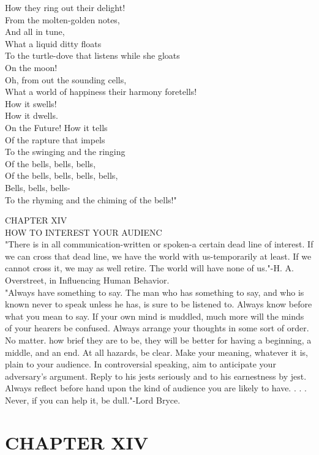 \documentclass[10pt]{article}
\begin{document}
\begin{enumerate}
How they ring out their delight!\\
From the molten-golden notes,\\
And all in tune,\\
What a liquid ditty floats\\
To the turtle-dove that listens while she gloats\\
On the moon!\\
Oh, from out the sounding cells,\\
What a world of happiness their harmony foretells!\\
How it swells!\\
How it dwells.\\
On the Future! How it tells\\
Of the rapture that impels\\
To the swinging and the ringing\\
Of the bells, bells, bells,\\
Of the bells, bells, bells, bells,\\
Bells, bells, bells-\\
To the rhyming and the chiming of the bells!"
\end{enumerate}

CHAPTER XIV\\
HOW TO INTEREST YOUR AUDIENC\\
"There is in all communication-written or spoken-a certain dead line of interest. If we can cross that dead line, we have the world with us-temporarily at least. If we cannot cross it, we may as well retire. The world will have none of us."-H. A. Overstreet, in Influencing Human Behavior.\\
"Always have something to say. The man who has something to say, and who is known never to speak unless he has, is sure to be listened to. Always know before what you mean to say. If your own mind is muddled, much more will the minds of your hearers be confused. Always arrange your thoughts in some sort of order. No matter. how brief they are to be, they will be better for having a beginning, a middle, and an end. At all hazards, be clear. Make your meaning, whatever it is, plain to your audience. In controversial speaking, aim to anticipate your adversary's argument. Reply to his jests seriously and to his earnestness by jest. Always reflect before hand upon the kind of audience you are likely to have. . . . Never, if you can help it, be dull."-Lord Bryce.

\section*{CHAPTER XIV}
\end{document}
